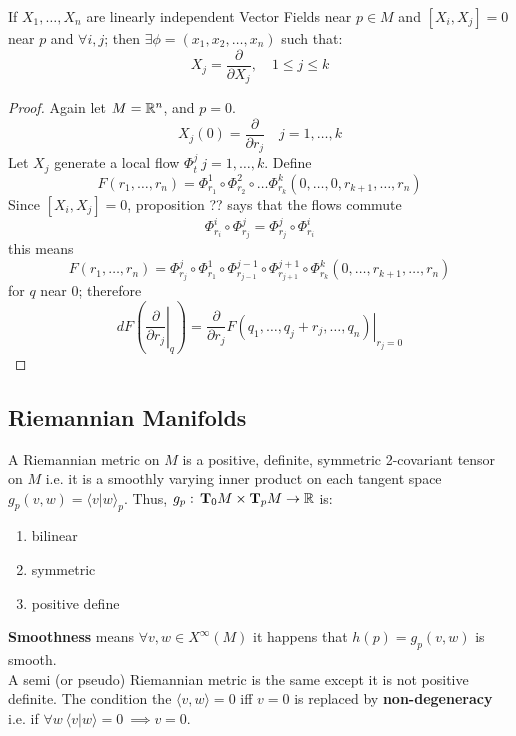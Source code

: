 \begin{teorema}
    If $X_1,\ldots, X_n$ are linearly independent Vector Fields near $p\in M$ and $[X_i,X_j]=0$ near $p$ and $\forall i,j$; then $\exists \phi= (x_1,x_2,\ldots,x_n)$ such that:
    $$X_j = \frac{\partial}{\partial X_j}, \quad 1\leq j \leq k$$
    \begin{proof}
        Again let $M=\mathbb{R}^n$, and $p=0$.
        $$X_j(0)= \frac{\partial}{\partial r_j} \quad j=1,\ldots,k$$
        Let $X_j$ generate a local flow $\Phi_t^j\ j=1,\ldots,k$. Define 
        $$F(r_1,\ldots,r_n)=\Phi_{r_1}^1\circ \Phi_{r_2}^2\circ \ldots\Phi_{r_k}^k(0,\ldots,0,r_{k+1},\ldots, r_n)$$
        Since $[X_i,X_j]=0$, proposition ?? says that the flows commute
        $$\Phi_{r_i}^i \circ \Phi_{r_j}^j= \Phi_{r_j}^j\circ \Phi_{r_i}^i$$
        this means
        $$F(r_1,\ldots, r_n) = \Phi_{r_j}^j \circ \Phi_{r_1}^1 \circ \Phi_{r_{j-1}}^{j-1}\circ  \Phi_{r_{j+1}}^{j+1} \circ \Phi_{r_{k}}^{k}(0,\ldots, r_{k+1},\ldots,r_n)$$
        for $q$ near 0; therefore
        $$dF\left(\left.\frac{\partial}{\partial r_j}\right|_q\right)= \frac{\partial}{\partial r_j}\left.F(q_1,\ldots, q_j+r_j,\ldots,q_n)\right|_{r_j=0}$$
    \end{proof}
\end{teorema}

\subsection{Riemannian Manifolds}
\begin{ddef}
    A Riemannian metric on $M$ is a positive, definite, symmetric 2-covariant tensor on $M$ i.e. it is a smoothly varying inner product on each tangent space $g_p(v,w) = \langle v | w \rangle_p$. Thus, $g_p:\, \text{\textbf{T}}_0M \times \text{\textbf{T}}_pM \to \mathbb{R}$ is:
    \begin{enumerate}
        \item bilinear
        \item symmetric
        \item positive define
    \end{enumerate}
    \textbf{Smoothness} means $\forall v,w\in X^\infty(M)$ it happens that $h(p)= g_p(v,w)$ is smooth.\\
    A semi (or pseudo) Riemannian metric is the same except it is not positive definite. The condition the $\langle v,w\rangle= 0$ iff $v=0$ is replaced by \textbf{non-degeneracy} i.e. if $\forall w\ \langle v|w\rangle=0 \ \implies v=0$.
\end{ddef} 


